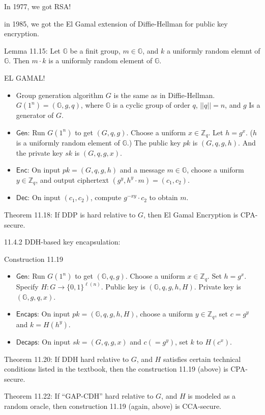 \documentclass[12pt]{article}
\newcommand{\Z}{\mathbb{Z}}
\newcommand{\G}{\mathbb{G}}
\newcommand{\Enc}{\mathsf{Enc}}
\newcommand{\Dec}{\mathsf{Dec}}
\newcommand{\Encaps}{\mathsf{Encaps}}
\newcommand{\Decaps}{\mathsf{Decaps}}
\newcommand{\Gen}{\mathsf{Gen}}
\begin{document}
In 1977, we got RSA!

in 1985, we got the El Gamal extension of Diffie-Hellman for public key encryption.

Lemma 11.15: Let $\G$ be a finit group, $m\in\G$, and $k$ a uniformly random elemnt of $\G$. Then $m\cdot k$ is a uniformly random element of $\G$.

EL GAMAL!\begin{itemize}

\item Group generation algorithm $G$ is the same as in Diffie-Hellman. $G(1^n)=(\G,g,q)$, where $\G$ is a cyclic group of order $q$, $||q||=n$, and $g$ Is a generator of $G$.

\item $\Gen$: Run $G(1^n)$ to get $(G,q,g)$. Choose a uniform $x\in\Z_q$. Let $h=g^x$. ($h$ is a uniformly random element of $\G$.) The public key $pk$ is $(G,q,g,h)$. And the private key $sk$ is $(G,q,g,x)$.

\item $\Enc$: On input $pk=(G,q,g,h)$ and a message $m\in\G$, choose a uniform $y\in\Z_q$, and output ciphertext $(g^y,h^y\cdot m)=(c_1,c_2)$.

\item $\Dec$: On input $(c_1,c_2)$, compute $g^{-xy}\cdot c_2$ to obtain $m$.

\end{itemize}

Theorem 11.18: If DDP is hard relative to $G$, then El Gamal Encryption is CPA-secure.

11.4.2 DDH-based key encapsulation:

Construction 11.19\begin{itemize}

\item $\Gen$: Run $G(1^n)$ to get $(\G,q,g)$. Choose a uniform $x\in\Z_q$. Set $h=g^x$. Specify $H:G\to\{0,1\}^{\ell(n)}$. Public key is $(\G,q,g,h,H)$. Private key is $(\G,g,q,x)$.

\item $\Encaps$: On input $pk=(\G,q,g,h,H)$, choose a uniform $y\in\Z_q$, set $c=g^y$ and $k=H(h^y)$.

\item $\Decaps$: On input $sk=(G,q,g,x)$ and $c(=g^y)$, set $k$ to $H(c^x)$.

\end{itemize}

Theorem 11.20: If DDH hard relative to $G$, and $H$ satisfies certain technical conditions listed in the textbook, then the construction 11.19 (above) is CPA-secure.

Theorem 11.22: If ``GAP-CDH'' hard relative to $G$, and $H$ is modeled as a random oracle, then construction 11.19 (again, above) is CCA-secure.
\end{document}
